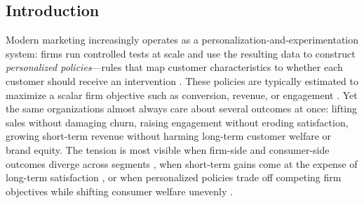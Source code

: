 \documentclass[11pt,letterpaper,english]{article}
\theoremstyle{definition}
\theoremstyle{definition}
\begin{document}
\begin{abstract}
\noindent \textbf{Keywords:} personalized marketing, multi-objective trade-offs, interpretable machine learning, transparency, heterogeneous treatment effects, recursive partitioning, algorithmic accountability, Digital Services Act

\end{abstract}


\begin{bibunit}
\newpage
\section{Introduction}
\label{sec:intro}

Modern marketing increasingly operates as a personalization-and-experimentation system: firms run controlled tests at scale and use the resulting data to construct \emph{personalized policies}---rules that map customer characteristics to whether each customer should receive an intervention \citep{rafieian2023ai, lemmens2025personalization}. These policies are typically estimated to maximize a scalar firm objective such as conversion, revenue, or engagement \citep{simester2020targeting, hitsch2024heterogeneous, ascarza2018retention}. Yet the same organizations almost always care about several outcomes at once: lifting sales without damaging churn, raising engagement without eroding satisfaction, growing short-term revenue without harming long-term customer welfare or brand equity. The tension is most visible when firm-side and consumer-side outcomes diverge across segments \citep{donnelly2024welfare, dube2023personalized}, when short-term gains come at the expense of long-term satisfaction \citep{hohnhold2015focusing, anderson2004longrun}, or when personalized policies trade off competing firm objectives while shifting consumer welfare unevenly \citep{goli2025personalizing}.


\end{bibunit}
\end{document}
